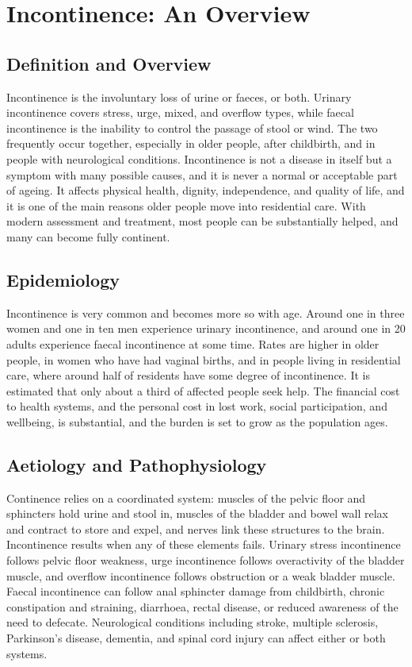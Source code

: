 \chapter{Incontinence: An Overview}

\section*{Definition and Overview}
Incontinence is the involuntary loss of urine or faeces, or both. Urinary incontinence covers stress, urge, mixed, and overflow types, while faecal incontinence is the inability to control the passage of stool or wind. The two frequently occur together, especially in older people, after childbirth, and in people with neurological conditions. Incontinence is not a disease in itself but a symptom with many possible causes, and it is never a normal or acceptable part of ageing. It affects physical health, dignity, independence, and quality of life, and it is one of the main reasons older people move into residential care. With modern assessment and treatment, most people can be substantially helped, and many can become fully continent.

\section*{Epidemiology}
Incontinence is very common and becomes more so with age. Around one in three women and one in ten men experience urinary incontinence, and around one in 20 adults experience faecal incontinence at some time. Rates are higher in older people, in women who have had vaginal births, and in people living in residential care, where around half of residents have some degree of incontinence. It is estimated that only about a third of affected people seek help. The financial cost to health systems, and the personal cost in lost work, social participation, and wellbeing, is substantial, and the burden is set to grow as the population ages.

\section*{Aetiology and Pathophysiology}
Continence relies on a coordinated system: muscles of the pelvic floor and sphincters hold urine and stool in, muscles of the bladder and bowel wall relax and contract to store and expel, and nerves link these structures to the brain. Incontinence results when any of these elements fails. Urinary stress incontinence follows pelvic floor weakness, urge incontinence follows overactivity of the bladder muscle, and overflow incontinence follows obstruction or a weak bladder muscle. Faecal incontinence can follow anal sphincter damage from childbirth, chronic constipation and straining, diarrhoea, rectal disease, or reduced awareness of the need to defecate. Neurological conditions including stroke, multiple sclerosis, Parkinson's disease, dementia, and spinal cord injury can affect either or both systems.

